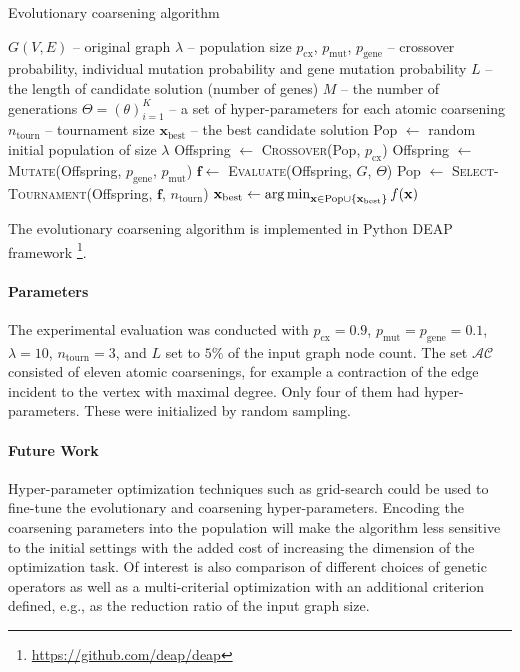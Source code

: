 \begin{algorithm}
\caption{Evolutionary coarsening algorithm}
\begin{algorithmic}
\Require $G(V, E)$ -- original graph
\Require $\lambda$ -- population size
\Require $p_\mathrm{cx}$, $p_\mathrm{mut}$, $p_\mathrm{gene}$ -- crossover probability, individual mutation probability and gene mutation probability
\Require $L$ -- the length of candidate solution (number of genes)
\Require $M$ -- the number of generations
\Require $\Theta = (\theta)_{i=1}^{K}$ -- a set of hyper-parameters for each atomic coarsening
\Require $n_\mathrm{tourn}$ -- tournament size
\Ensure $\mathbf{x}_\mathrm{best}$ -- the best candidate solution
\State Pop $\gets$ random initial population of size $\lambda$
\State Offspring $\gets$ \textsc{Crossover}(Pop, $p_\mathrm{cx}$)  \label{eva:crossover}
\State Offspring $\gets$ \textsc{Mutate}(Offspring, $p_\mathrm{gene}$, $p_\mathrm{mut}$)  \label{eva:mutate}
\State $\mathbf{f} \gets$ \textsc{Evaluate}(Offspring, $G$, $\Theta$) \label{eva:eval} 
\State Pop $\gets$ \textsc{Select-Tournament}(Offspring, $\mathbf{f}$, $n_\mathrm{tourn}$) \label{eva:select} 
\State $\mathbf{x}_\mathrm{best} \gets \operatorname*{arg\,min}_{\mathbf{x} \in \mathrm{Pop} \cup \{\mathbf{x}_\mathrm{best}\}}{f(\mathbf{x})}$
\EndFor
\end{algorithmic}
\label{alg:eva}
\end{algorithm}

The evolutionary coarsening algorithm is implemented in Python DEAP framework \cite{fortin2012deap}\footnote{\url{https://github.com/deap/deap}}.

\paragraph{Parameters} The experimental evaluation was conducted with $p_\mathrm{cx} = 0.9$, $p_\mathrm{mut} = p_\mathrm{gene} = 0.1$, $\lambda = 10$, $n_\mathrm{tourn} = 3$, and $L$ set to $5\%$ of the input graph node count. The set $\mathcal{AC}$ consisted of eleven atomic coarsenings, for example a contraction of the edge incident to the vertex with maximal degree. Only four of them had hyper-parameters. These were initialized by random sampling.

\paragraph{Future Work} Hyper-parameter optimization techniques such as grid-search could be used to fine-tune the evolutionary and coarsening hyper-parameters. Encoding the coarsening parameters into the population will make the algorithm less sensitive to the initial settings with the added cost of increasing the dimension of the optimization task. Of interest is also comparison of different choices of genetic operators as well as a multi-criterial optimization with an additional criterion defined, e.g., as the reduction ratio of the input graph size.
